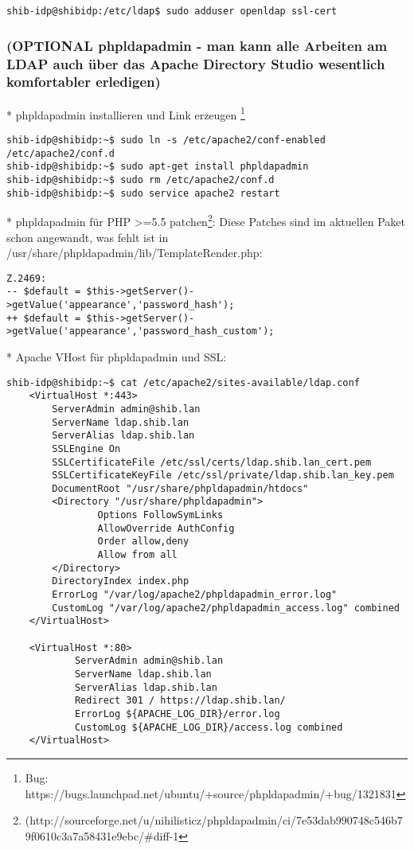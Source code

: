\begin{lstlisting}
shib-idp@shibidp:/etc/ldap$ sudo adduser openldap ssl-cert
\end{lstlisting}

\subsubsection*{(OPTIONAL phpldapadmin - man kann alle Arbeiten am LDAP auch
über das Apache Directory Studio wesentlich komfortabler erledigen)} * phpldapadmin installieren und Link erzeugen \footnote{Bug:
https://bugs.launchpad.net/ubuntu/+source/phpldapadmin/+bug/1321831}
\begin{lstlisting}
shib-idp@shibidp:~$ sudo ln -s /etc/apache2/conf-enabled /etc/apache2/conf.d
shib-idp@shibidp:~$ sudo apt-get install phpldapadmin
shib-idp@shibidp:~$ sudo rm /etc/apache2/conf.d
shib-idp@shibidp:~$ sudo service apache2 restart
\end{lstlisting}
* phpldapadmin für PHP >=5.5 patchen\footnote{
(http://sourceforge.net/u/nihilisticz/phpldapadmin/ci/7e53dab990748c546b79f0610c3a7a58431e9ebc/\#diff-1}:\newline
Diese Patches sind im aktuellen Paket schon angewandt, was fehlt ist
in /usr/share/phpldapadmin/lib/TemplateRender.php:
\begin{lstlisting}
Z.2469:
-- $default = $this->getServer()->getValue('appearance','password_hash');
++ $default = $this->getServer()->getValue('appearance','password_hash_custom');
\end{lstlisting}

* Apache VHost für phpldapadmin und SSL:
\begin{lstlisting}
shib-idp@shibidp:~$ cat /etc/apache2/sites-available/ldap.conf
	<VirtualHost *:443>
		ServerAdmin admin@shib.lan
		ServerName ldap.shib.lan
		ServerAlias ldap.shib.lan
		SSLEngine On
		SSLCertificateFile /etc/ssl/certs/ldap.shib.lan_cert.pem
		SSLCertificateKeyFile /etc/ssl/private/ldap.shib.lan_key.pem
		DocumentRoot "/usr/share/phpldapadmin/htdocs"
		<Directory "/usr/share/phpldapadmin">
				Options FollowSymLinks
				AllowOverride AuthConfig
				Order allow,deny
				Allow from all
		</Directory>
		DirectoryIndex index.php
		ErrorLog "/var/log/apache2/phpldapadmin_error.log"
		CustomLog "/var/log/apache2/phpldapadmin_access.log" combined
	</VirtualHost>

	<VirtualHost *:80>
			ServerAdmin admin@shib.lan
			ServerName ldap.shib.lan
			ServerAlias ldap.shib.lan
			Redirect 301 / https://ldap.shib.lan/
			ErrorLog ${APACHE_LOG_DIR}/error.log
			CustomLog ${APACHE_LOG_DIR}/access.log combined
	</VirtualHost>
\end{lstlisting}

